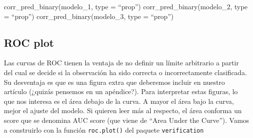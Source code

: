 \documentclass[]{book}
\newenvironment{Shaded}{\begin{snugshade}}{\end{snugshade}}
\newcommand{\KeywordTok}[1]{\textcolor[rgb]{0.13,0.29,0.53}{\textbf{#1}}}
\newcommand{\DataTypeTok}[1]{\textcolor[rgb]{0.13,0.29,0.53}{#1}}
\newcommand{\DecValTok}[1]{\textcolor[rgb]{0.00,0.00,0.81}{#1}}
\newcommand{\FloatTok}[1]{\textcolor[rgb]{0.00,0.00,0.81}{#1}}
\newcommand{\StringTok}[1]{\textcolor[rgb]{0.31,0.60,0.02}{#1}}
\newcommand{\CommentTok}[1]{\textcolor[rgb]{0.56,0.35,0.01}{\textit{#1}}}
\newcommand{\OperatorTok}[1]{\textcolor[rgb]{0.81,0.36,0.00}{\textbf{#1}}}
\newcommand{\NormalTok}[1]{#1}
\begin{document}
corr\_pred\_binary(modelo\_1, type = ``prop'')
corr\_pred\_binary(modelo\_2, type = ``prop'')
corr\_pred\_binary(modelo\_3, type = ``prop'')

\subsection{ROC plot}\label{roc-plot}

Las curvas de ROC tienen la ventaja de no definir un límite arbitrario a
partir del cual se decide si la observación ha sido correcta o
incorrectamente clasificada. Su desventaja es que es una figura extra
que deberemos incluir en nuestro artículo (¿quizás pensemos en un
apéndice?). Para interpretar estas figuras, lo que nos interesa es el
área debajo de la curva. A mayor el área bajo la curva, mejor el ajuste
del modelo. Si quieren leer más al respecto, el área conforma un score
que se denomina AUC score (que viene de ``Area Under the Curve''). Vamos
a construirlo con la función \texttt{roc.plot()} del paquete
\texttt{verification}

\begin{Shaded}
\end{Shaded}
\end{document}
